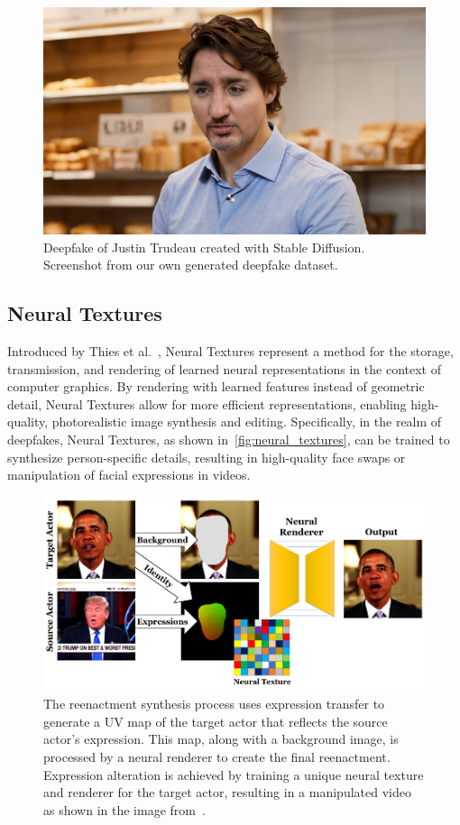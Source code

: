 \begin{figure}[ht]
	\centering
	\includegraphics[width=0.59\columnwidth]{figures/justion-trudeau-stable-diff}
	\caption{Deepfake of Justin Trudeau created with Stable Diffusion.
		Screenshot from our own generated deepfake dataset.} %
\end{figure}

\subsection{Neural Textures}
Introduced by Thies et al.~\cite{thies2019deferred}, Neural Textures represent
a method for the storage, transmission, and rendering of learned
neural representations in the context of computer graphics.
By rendering with learned features instead of geometric detail, Neural
Textures allow for more efficient representations, enabling high-quality,
photorealistic image synthesis and editing. Specifically, in the realm of
deepfakes, Neural Textures, as shown in~\autoref{fig:neural_textures}, can be trained to synthesize person-specific
details, resulting in high-quality face swaps or manipulation of facial
expressions in videos.

\begin{figure}[hb]
	\centering
	\includegraphics[width=0.7\columnwidth]{figures/neural_textures}
	\caption{The reenactment synthesis process uses expression transfer
		to generate a UV map of the target actor that reflects the source
		actor's expression. This map, along with a background image, is
		processed by a neural renderer to create the final reenactment.
		Expression alteration is achieved by training a unique neural
		texture and renderer for the target actor, resulting in a
		manipulated video as shown in the image from~\cite{thies2019deferred}.}\label{fig:neural_textures}
\end{figure}


